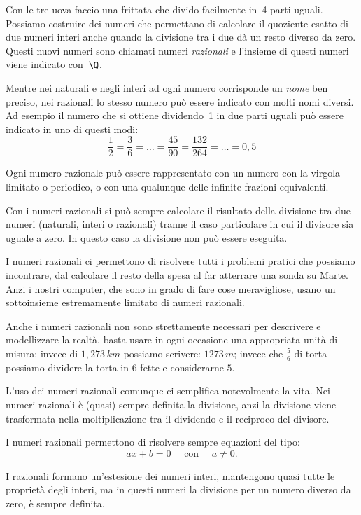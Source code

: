 Con le tre uova faccio una frittata che divido facilmente in~4 parti 
uguali. 
Possiamo costruire dei numeri che permettano di calcolare il 
quoziente esatto di due numeri interi anche quando la divisione tra i due 
dà un resto diverso da zero. 
Questi nuovi numeri sono chiamati numeri \emph{razionali} 
e l'insieme di questi numeri viene indicato con~\(\Q\).

Mentre nei naturali e negli interi ad ogni numero corrisponde un 
\emph{nome} ben preciso, nei razionali lo stesso numero può essere indicato 
con molti nomi diversi. 
Ad esempio il numero che si ottiene dividendo~1 in due parti 
uguali può essere indicato in uno di questi modi:
\[\frac{1}{2}=\frac{3}{6}=\dots=\frac{45}{90}=\frac{132}{264}=\dots=0,5\]

Ogni numero razionale può essere rappresentato con un numero con la virgola 
limitato o periodico, o con una qualunque delle infinite frazioni equivalenti.

Con i numeri razionali si può sempre calcolare il risultato della divisione 
tra due numeri (naturali, interi o razionali) tranne il caso particolare in 
cui il divisore sia uguale a zero. 
In questo caso la divisione non può essere eseguita.

I numeri razionali ci permettono di risolvere tutti i problemi pratici che 
possiamo incontrare, dal calcolare il resto della spesa al far atterrare una 
sonda su Marte. 
Anzi i nostri computer, che sono in grado di fare cose meravigliose, usano un 
sottoinsieme estremamente limitato di numeri razionali.

Anche i numeri razionali non sono strettamente necessari per descrivere e 
modellizzare la realtà, basta usare in ogni occasione una appropriata unità 
di misura: invece di \(1,273\,km\) possiamo scrivere: \(1273\,m\); 
invece che \(\frac{5}{6}\) di torta possiamo dividere la torta in \(6\) fette
e considerarne \(5\).

L'uso dei numeri razionali comunque ci semplifica notevolmente la vita.
Nei numeri razionali è (quasi) sempre definita la divisione, anzi la 
divisione viene trasformata nella moltiplicazione tra il dividendo e il 
reciproco del divisore.

I numeri razionali permettono di risolvere sempre equazioni del tipo:
\[ax+b=0 \quad \text{ con } \quad a \neq 0.\]

I razionali formano un'estesione dei numeri interi, mantengono quasi tutte 
le proprietà degli interi, ma in questi numeri la divisione per un numero 
diverso da zero, è sempre definita.

